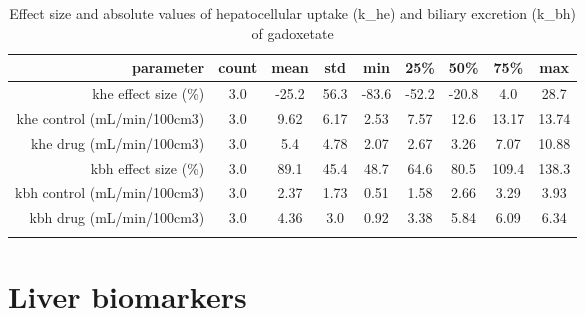 \documentclass{epflreport}%
\begin{document}
%
\begin{longtable}{rcccccccc}%
\hline%
parameter&count&mean&std&min&25\%&50\%&75\%&max\\%
\hline%
khe effect size (\%)&3.0&{-}25.2&56.3&{-}83.6&{-}52.2&{-}20.8&4.0&28.7\\%
khe control (mL/min/100cm3)&3.0&9.62&6.17&2.53&7.57&12.6&13.17&13.74\\%
khe drug (mL/min/100cm3)&3.0&5.4&4.78&2.07&2.67&3.26&7.07&10.88\\%
kbh effect size (\%)&3.0&89.1&45.4&48.7&64.6&80.5&109.4&138.3\\%
kbh control (mL/min/100cm3)&3.0&2.37&1.73&0.51&1.58&2.66&3.29&3.93\\%
kbh drug (mL/min/100cm3)&3.0&4.36&3.0&0.92&3.38&5.84&6.09&6.34\\%
\hline%
\caption{Effect size and absolute values of hepatocellular uptake (k\_he) and biliary excretion (k\_bh) of gadoxetate} \\%
\end{longtable}%
\clearpage%
\section{Liver biomarkers}%
\label{sec:Liverbiomarkers}%
\end{document}
